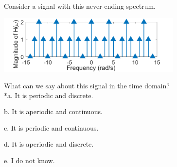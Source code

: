 
Consider a signal with this never-ending spectrum.

\includegraphics[width=3.62569in,height=1.16421in]{../../Images/FrequencyDomainQ5.png}

What can we say about this signal in the time domain?\\

*a. It is periodic and discrete.

b. It is aperiodic and continuous.

c. It is periodic and continuous.

d. It is aperiodic and discrete.

e. I do not know.\\
